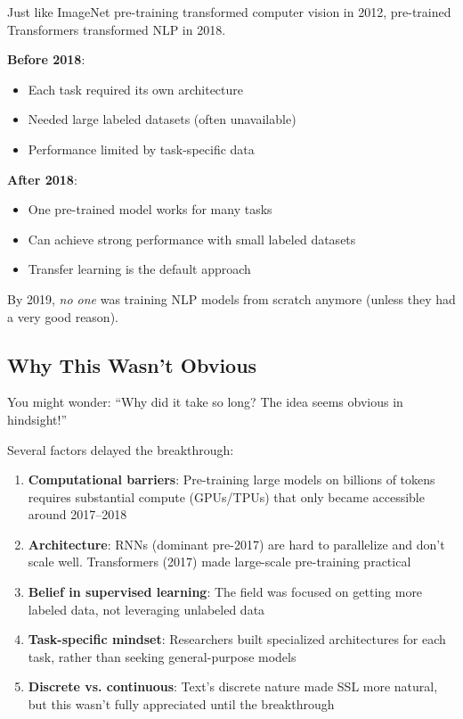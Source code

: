 \documentclass{article}
\begin{document}
\begin{tcolorbox}[colback=red!5!white, colframe=red!75!black, title=The Impact]
Just like ImageNet pre-training transformed computer vision in 2012, pre-trained Transformers transformed NLP in 2018.

\textbf{Before 2018}:
\begin{itemize}
\item Each task required its own architecture
\item Needed large labeled datasets (often unavailable)
\item Performance limited by task-specific data
\end{itemize}

\textbf{After 2018}:
\begin{itemize}
\item One pre-trained model works for many tasks
\item Can achieve strong performance with small labeled datasets
\item Transfer learning is the default approach
\end{itemize}

By 2019, \textit{no one} was training NLP models from scratch anymore (unless they had a very good reason).
\end{tcolorbox}

\subsection{Why This Wasn't Obvious}

You might wonder: ``Why did it take so long? The idea seems obvious in hindsight!''

Several factors delayed the breakthrough:

\begin{enumerate}
\item \textbf{Computational barriers}: Pre-training large models on billions of tokens requires substantial compute (GPUs/TPUs) that only became accessible around 2017--2018

\item \textbf{Architecture}: RNNs (dominant pre-2017) are hard to parallelize and don't scale well. Transformers (2017) made large-scale pre-training practical

\item \textbf{Belief in supervised learning}: The field was focused on getting more labeled data, not leveraging unlabeled data

\item \textbf{Task-specific mindset}: Researchers built specialized architectures for each task, rather than seeking general-purpose models

\item \textbf{Discrete vs. continuous}: Text's discrete nature made SSL more natural, but this wasn't fully appreciated until the breakthrough
\end{enumerate}
\end{document}
